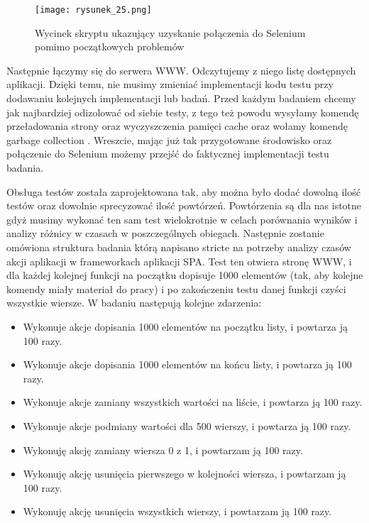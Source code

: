 \begin{figure}[!ht]
    \centering
    \texttt{[image: rysunek\_25.png]}
    \caption{Wycinek skryptu ukazujący uzyskanie połączenia do Selenium pomimo początkowych problemów}
    \label{fig:rysunek_25}
\end{figure}

Następnie łączymy się do serwera WWW. Odczytujemy z niego listę dostępnych aplikacji.
Dzięki temu, nie musimy zmieniać implementacji kodu testu przy dodawaniu kolejnych implementacji lub badań.
Przed każdym badaniem chcemy jak najbardziej odizolować od siebie testy, z tego też powodu wysyłamy komendę przeładowania strony oraz wyczyszczenia pamięci cache
oraz wołamy komendę garbage collection \cite{mozilla-memory}.
Wreszcie, mając już tak przygotowane środowisko oraz połączenie do Selenium możemy przejść do faktycznej implementacji testu badania.

Obsługa testów została zaprojektowana tak, aby można było dodać dowolną ilość testów oraz dowolnie sprecyzować ilość powtórzeń.
Powtórzenia są dla nas istotne gdyż musimy wykonać ten sam test wielokrotnie w celach porównania wyników i analizy różnicy w czasach w poszczególnych obiegach.
Następnie zostanie omówiona struktura badania którą napisano stricte na potrzeby analizy czasów akcji aplikacji w frameworkach aplikacji SPA.
Test ten otwiera stronę WWW, i dla każdej kolejnej funkcji na początku dopisuje 1000 elementów (tak, aby kolejne komendy miały materiał do pracy)
i po zakończeniu testu danej funkcji czyści wszystkie wiersze. W badaniu następują kolejne zdarzenia:

\begin{itemize}
    \item Wykonuje akcje dopisania 1000 elementów na początku listy, i powtarza ją 100 razy.
    \item Wykonuje akcje dopisania 1000 elementów na końcu listy, i powtarza ją 100 razy.
    \item Wykonuje akcje zamiany wszystkich wartości na liście, i powtarza ją 100 razy.
    \item Wykonuje akcje podmiany wartości dla 500 wierszy, i powtarza ją 100 razy.
    \item Wykonuję akcję zamiany wiersza 0 z 1, i powtarzam ją 100 razy.
    \item Wykonuję akcję usunięcia pierwszego w kolejności wiersza, i powtarzam ją 100 razy.
    \item Wykonuję akcję usunięcia wszystkich wierszy, i powtarzam ją 100 razy.
\end{itemize}

